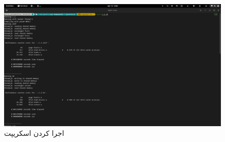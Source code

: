 \documentclass{article}
\begin{document}
\begin{figure}[H]
   \centering
   \includegraphics[width=\linewidth]{1.2.png}
   \caption{اجرا کردن اسکریپت}
\end{figure}
\end{document}

